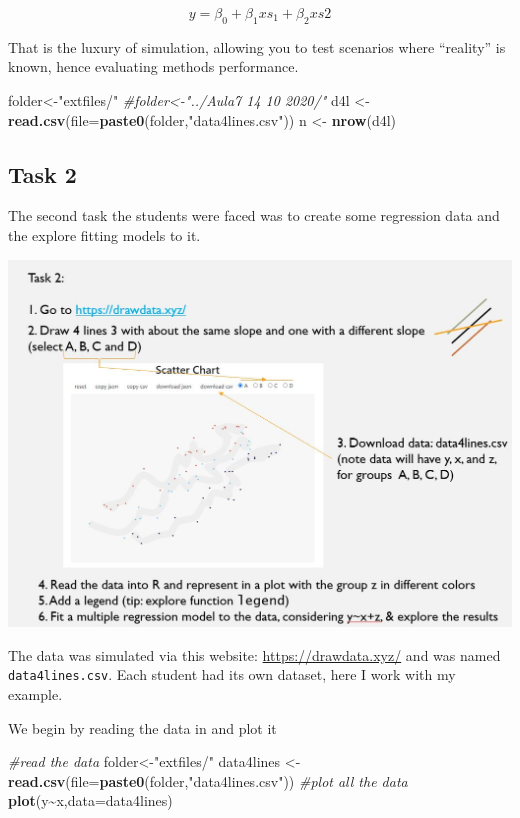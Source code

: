 \documentclass[
]{book}
\newenvironment{Shaded}{\begin{snugshade}}{\end{snugshade}}
\newcommand{\AttributeTok}[1]{\textcolor[rgb]{0.13,0.29,0.53}{#1}}
\newcommand{\CommentTok}[1]{\textcolor[rgb]{0.56,0.35,0.01}{\textit{#1}}}
\newcommand{\FunctionTok}[1]{\textcolor[rgb]{0.13,0.29,0.53}{\textbf{#1}}}
\newcommand{\NormalTok}[1]{#1}
\newcommand{\OtherTok}[1]{\textcolor[rgb]{0.56,0.35,0.01}{#1}}
\newcommand{\SpecialCharTok}[1]{\textcolor[rgb]{0.81,0.36,0.00}{\textbf{#1}}}
\newcommand{\StringTok}[1]{\textcolor[rgb]{0.31,0.60,0.02}{#1}}
\begin{document}
\[y=\beta_0+\beta_1 xs_1+\beta_2 xs2\]

That is the luxury of simulation, allowing you to test scenarios where ``reality'' is known, hence evaluating methods performance.

\begin{Shaded}
\begin{Highlighting}[]
\NormalTok{folder}\OtherTok{\textless{}{-}}\StringTok{"extfiles/"}
\CommentTok{\#folder\textless{}{-}"../Aula7 14 10 2020/"}
\NormalTok{d4l }\OtherTok{\textless{}{-}} \FunctionTok{read.csv}\NormalTok{(}\AttributeTok{file=}\FunctionTok{paste0}\NormalTok{(folder,}\StringTok{"data4lines.csv"}\NormalTok{))}
\NormalTok{n }\OtherTok{\textless{}{-}} \FunctionTok{nrow}\NormalTok{(d4l)}
\end{Highlighting}
\end{Shaded}

\subsection{Task 2}\label{task-2}

The second task the students were faced was to create some regression data and the explore fitting models to it.

\includegraphics{extfiles/Aula7Task7.JPG}

The data was simulated via this website: \url{https://drawdata.xyz/} and was named \texttt{data4lines.csv}. Each student had its own dataset, here I work with my example.

We begin by reading the data in and plot it

\begin{Shaded}
\begin{Highlighting}[]
\CommentTok{\#read the data}
\NormalTok{folder}\OtherTok{\textless{}{-}}\StringTok{"extfiles/"}
\NormalTok{data4lines }\OtherTok{\textless{}{-}} \FunctionTok{read.csv}\NormalTok{(}\AttributeTok{file=}\FunctionTok{paste0}\NormalTok{(folder,}\StringTok{"data4lines.csv"}\NormalTok{))}
\CommentTok{\#plot all the data}
\FunctionTok{plot}\NormalTok{(y}\SpecialCharTok{\textasciitilde{}}\NormalTok{x,}\AttributeTok{data=}\NormalTok{data4lines)}
\end{Highlighting}
\end{Shaded}
\end{document}
